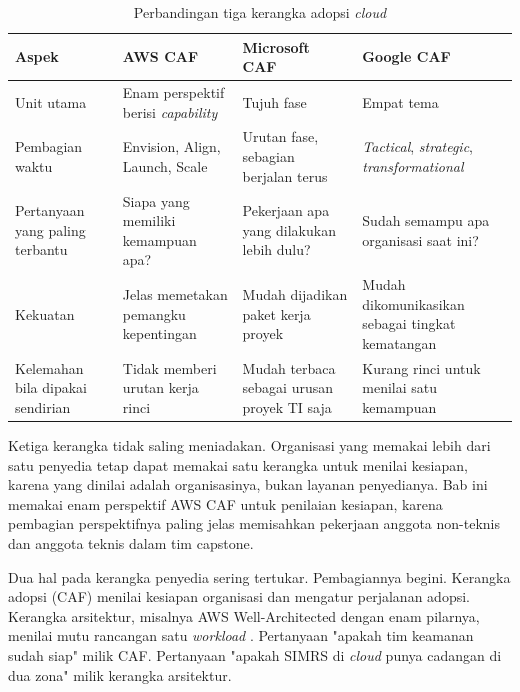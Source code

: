 \begin{table}[!htb]
  \centering
  \footnotesize
  \caption{Perbandingan tiga kerangka adopsi \textit{cloud}}
  \label{tab:ch04-tiga-caf}
  \begin{tabularx}{\textwidth}{>{\raggedright\arraybackslash}p{1.9cm}
                               >{\raggedright\arraybackslash}X
                               >{\raggedright\arraybackslash}X
                               >{\raggedright\arraybackslash}X}
    \hline
    \textbf{Aspek} & \textbf{AWS CAF} & \textbf{Microsoft CAF} & \textbf{Google CAF} \\
    \hline
    Unit utama & Enam perspektif berisi \textit{capability} & Tujuh fase & Empat tema \\
    \hline
    Pembagian waktu & Envision, Align, Launch, Scale & Urutan fase, sebagian berjalan
      terus & \textit{Tactical}, \textit{strategic}, \textit{transformational} \\
    \hline
    Pertanyaan yang paling terbantu & Siapa yang memiliki kemampuan apa? & Pekerjaan apa
      yang dilakukan lebih dulu? & Sudah semampu apa organisasi saat ini? \\
    \hline
    Kekuatan & Jelas memetakan pemangku kepentingan & Mudah dijadikan paket kerja proyek
      & Mudah dikomunikasikan sebagai tingkat kematangan \\
    \hline
    Kelemahan bila dipakai sendirian & Tidak memberi urutan kerja rinci & Mudah terbaca
      sebagai urusan proyek TI saja & Kurang rinci untuk menilai satu kemampuan \\
    \hline
  \end{tabularx}
\end{table}

Ketiga kerangka tidak saling meniadakan. Organisasi yang memakai lebih dari satu penyedia
tetap dapat memakai satu kerangka untuk menilai kesiapan, karena yang dinilai adalah
organisasinya, bukan layanan penyedianya. Bab ini memakai enam perspektif AWS CAF untuk
penilaian kesiapan, karena pembagian perspektifnya paling jelas memisahkan pekerjaan
anggota non-teknis dan anggota teknis dalam tim capstone.

Dua hal pada kerangka penyedia sering tertukar. Pembagiannya begini. Kerangka adopsi
(CAF) menilai kesiapan organisasi dan mengatur perjalanan adopsi. Kerangka arsitektur,
misalnya AWS Well-Architected dengan enam pilarnya, menilai mutu rancangan satu
\textit{workload} \cite{awswaf}. Pertanyaan "apakah tim keamanan sudah siap" milik CAF.
Pertanyaan "apakah SIMRS di \textit{cloud} punya cadangan di dua zona" milik kerangka
arsitektur.

